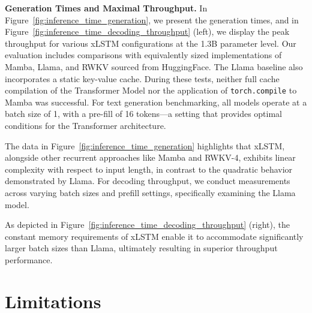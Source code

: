 \textbf{Generation Times and Maximal Throughput.} In Figure~\ref{fig:inference_time_generation}, we present the generation times, and in Figure~\ref{fig:inference_time_decoding_throughput} (left), we display the peak throughput for various xLSTM configurations at the 1.3B parameter level. Our evaluation includes comparisons with equivalently sized implementations of Mamba, Llama, and RWKV sourced from HuggingFace. The Llama baseline also incorporates a static key-value cache. During these tests, neither full cache compilation of the Transformer Model nor the application of \texttt{torch.compile} to Mamba was successful. For text generation benchmarking, all models operate at a batch size of 1, with a pre-fill of 16 tokens—a setting that provides optimal conditions for the Transformer architecture.

The data in Figure~\ref{fig:inference_time_generation} highlights that xLSTM, alongside other recurrent approaches like Mamba and RWKV-4, exhibits linear complexity with respect to input length, in contrast to the quadratic behavior demonstrated by Llama. For decoding throughput, we conduct measurements across varying batch sizes and prefill settings, specifically examining the Llama model.

As depicted in Figure~\ref{fig:inference_time_decoding_throughput} (right), the constant memory requirements of xLSTM enable it to accommodate significantly larger batch sizes than Llama, ultimately resulting in superior throughput performance.

\section{Limitations}

